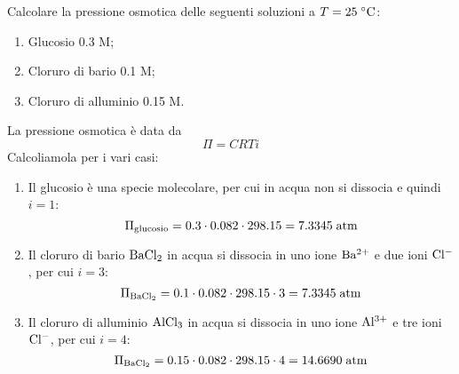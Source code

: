\begin{esercizio}
    Calcolare la pressione osmotica delle seguenti soluzioni a $T=25 \; \rm ^{\circ}C$:
    \begin{enumerate}
        \item Glucosio 0.3 M;
        \item Cloruro di bario 0.1 M;
        \item Cloruro di alluminio 0.15 M.
    \end{enumerate}
\end{esercizio}
\begin{soluzione}
    La pressione osmotica è data da
    \begin{equation*}
        \Pi=CRTi
    \end{equation*}
    Calcoliamola per i vari casi:
    \begin{enumerate}
        \item Il glucosio è una specie molecolare, per cui in acqua non si dissocia e quindi $i=1$:
        \begin{equation*}
            \Pi_{\rm glucosio}
            =0.3 \cdot 0.082 \cdot 298.15
            =7.3345 \; \rm atm
        \end{equation*}
        \item Il cloruro di bario $\rm BaCl_2$ in acqua si dissocia in uno ione $\rm Ba^{2+}$ e due ioni $\rm Cl^-$, per cui $i=3$:
        \begin{equation*}
            \Pi_{\rm BaCl_2}
            =0.1 \cdot 0.082 \cdot 298.15 \cdot 3
            =7.3345 \; \rm atm
        \end{equation*}
        \item Il cloruro di alluminio $\rm AlCl_3$ in acqua si dissocia in uno ione $\rm Al^{3+}$ e tre ioni $\rm Cl^-$, per cui $i=4$:
        \begin{equation*}
            \Pi_{\rm BaCl_2}
            =0.15 \cdot 0.082 \cdot 298.15 \cdot 4
            =14.6690 \; \rm atm
        \end{equation*}
    \end{enumerate}
\end{soluzione}

\newpage

